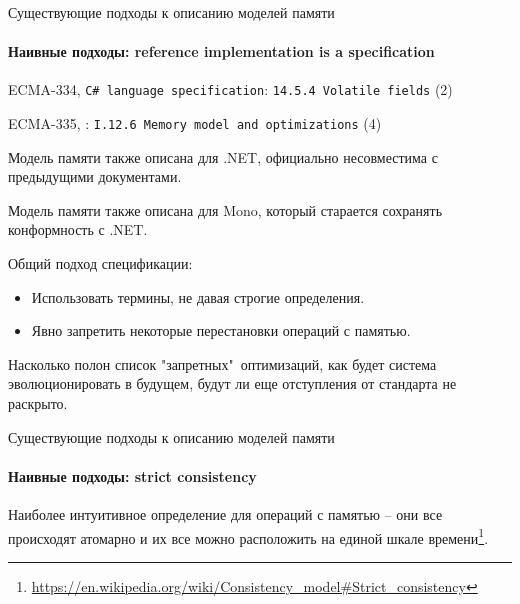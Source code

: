 \begin{frame}[t,noframenumbering]{Существующие подходы к описанию моделей памяти}
\framesubtitle{Наивные подходы: reference implementation is a specification}

{\small
ECMA-334, \texttt{C\# language specification}: \texttt{14.5.4 Volatile fields} (2)
}

{\small
ECMA-335, : \texttt{I.12.6 Memory model and optimizations} (4)
}

Модель памяти также описана для .NET, официально несовместима с предыдущими документами.

Модель памяти также описана для Mono, который старается сохранять конформность с .NET.

\pause
Общий подход спецификации:
\begin{itemize}
	\pause
	\item {}
	\pause
	Использовать термины, не давая строгие определения.

	\pause
	\item Явно запретить некоторые перестановки операций с памятью.
\end{itemize}

\pause
Насколько полон список "запретных"\ оптимизаций, как будет система эволюционировать в будущем, будут ли еще отступления от стандарта не раскрыто.
\end{frame}

\begin{frame}[fragile, t]{Существующие подходы к описанию моделей памяти}
\framesubtitle{Наивные подходы: strict consistency}

Наиболее интуитивное определение для операций с памятью -- они все происходят атомарно и их все можно расположить на единой шкале времени\footnote{\tiny\url{https://en.wikipedia.org/wiki/Consistency_model#Strict_consistency}}.

\end{frame}


